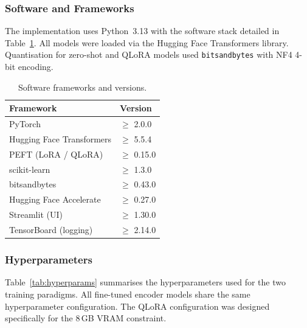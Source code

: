 \subsubsection{Software and Frameworks}
The implementation uses Python~3.13 with the software stack detailed in
Table~\ref{tab:software}.  All models were loaded via the Hugging Face
Transformers library.  Quantisation for zero-shot and QLoRA models used
\texttt{bitsandbytes} with NF4 4-bit encoding.

\begin{table}[t]
\centering
\caption{Software frameworks and versions.}
\label{tab:software}
\begin{tabular}{ll}
\hline
\textbf{Framework}        & \textbf{Version} \\
\hline
PyTorch                    & $\geq$ 2.0.0 \\
Hugging Face Transformers  & $\geq$ 5.5.4 \\
PEFT (LoRA / QLoRA)        & $\geq$ 0.15.0 \\
scikit-learn               & $\geq$ 1.3.0 \\
bitsandbytes               & $\geq$ 0.43.0 \\
Hugging Face Accelerate    & $\geq$ 0.27.0 \\
Streamlit (UI)             & $\geq$ 1.30.0 \\
TensorBoard (logging)      & $\geq$ 2.14.0 \\
\hline
\end{tabular}
\end{table}

\subsubsection{Hyperparameters}
Table~\ref{tab:hyperparams} summarises the hyperparameters used for the
two training paradigms.  All fine-tuned encoder models share the same
hyperparameter configuration.  The QLoRA configuration was designed
specifically for the 8\,GB VRAM constraint.

